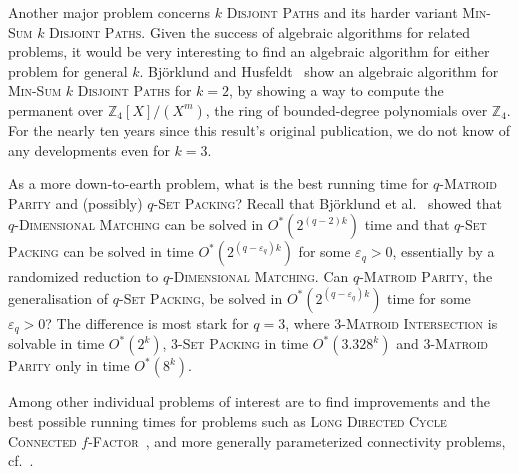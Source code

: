 \documentclass{theoretics}
\begin{document}
Another major problem concerns \textsc{$k$ Disjoint Paths}
and its harder variant \textsc{Min-Sum $k$ Disjoint Paths}.
Given the success of algebraic algorithms for related problems,
it would be very interesting to find an algebraic algorithm for either problem
for general $k$. Björklund and Husfeldt~\cite{BjorklundH19twodp}
show an algebraic algorithm for \textsc{Min-Sum $k$ Disjoint Paths} for $k=2$, 
by showing a way to compute the permanent over $\mathbb{Z}_4[X]/(X^m)$, the ring
of bounded-degree polynomials over $\mathbb{Z}_4$. For the nearly ten years
since this result's original publication, we do not know of any developments
even for $k=3$. 

As a more down-to-earth problem, what is the best running time for
\textsc{$q$-Matroid Parity} and (possibly) \textsc{$q$-Set Packing}?
Recall that Björklund et al.~\cite{BjorklundHKK17narrow} showed that
\textsc{$q$-Dimensional Matching} can be solved in $O^*(2^{(q-2)k})$ time
and that \textsc{$q$-Set Packing} can be solved in time $O^*(2^{(q-\varepsilon_q)k})$
for some $\varepsilon_q > 0$, essentially by a randomized reduction to
\textsc{$q$-Dimensional Matching}.
Can \textsc{$q$-Matroid Parity}, the generalisation of \textsc{$q$-Set Packing},
be solved in $O^*(2^{(q-\varepsilon_q)k})$ time for some $\varepsilon_q > 0$?
The difference is most stark for $q=3$, where
\textsc{3-Matroid Intersection} is solvable in time $O^*(2^k)$, 
\textsc{3-Set Packing} in time $O^*(3.328^k)$
and \textsc{3-Matroid Parity} only in time $O^*(8^k)$. 

Among other individual problems of interest are to find improvements
and the best possible running times for problems such as 
\textsc{Long Directed Cycle}~\cite{FominLPS16JACM,Zehavi16ldc}
\textsc{Connected $f$-Factor}~\cite{FominGPS19sidma},
and more generally parameterized connectivity problems, cf.~\cite{AgrawalMPS22rSNDP,Feldmann0L22}.

\printbibliography
\end{document}
